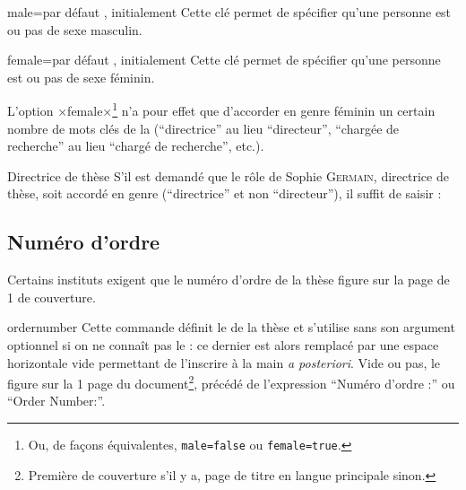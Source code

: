 \begin{docKey}{male}{=\textbar{}}{par défaut
    , initialement }
  Cette clé permet de spécifier qu'une personne est ou pas de sexe masculin.
\end{docKey}

\begin{docKey}{female}{=\textbar{}}{par défaut
    , initialement }
  Cette clé permet de spécifier qu'une personne est ou pas de sexe féminin.
\end{docKey}

L'option ×female×\footnote{Ou, de façons équivalentes,
  \protect\lstinline|male=false| ou \protect\lstinline|female=true|.} n'a pour
effet que d'accorder en genre féminin un certain nombre de mots clés de la
\yatcl{} (\enquote{directrice} au lieu \enquote{directeur}, \enquote{chargée de
  recherche} au lieu \enquote{chargé de recherche}, etc.).

\begin{dbexample}{Directrice de thèse}{}
  S'il est demandé que le rôle de Sophie \textsc{Germain}, directrice de thèse,
  soit accordé en genre (\enquote{directrice} et non \enquote{directeur}), il
  suffit de saisir :
\begin{preamblecode}[title=Par exemple dans le \File{\characteristicsfile}]
\end{preamblecode}
\end{dbexample}

\subsection{Numéro d'ordre}
\label{sec:numero-dordre}

Certains instituts exigent que le numéro d'ordre de la thèse figure sur la page
de 1\iere{} de couverture.

\begin{docCommand}{ordernumber}{}
  Cette commande définit le  de la thèse et s'utilise sans
  son argument optionnel si on ne connaît pas  le  : ce dernier est alors remplacé par une espace horizontale vide
  permettant de l'inscrire à la main \emph{a posteriori}. Vide ou pas, le
   figure sur  la 1\iere{} page
  du document\footnote{Première de couverture s'il y a, page de titre en langue
    principale sinon.}, précédé de l'expression \enquote{Num\'ero d'ordre :} ou
  \foreignquote{english}{Order Number:}\selonlangue.
\end{docCommand}

